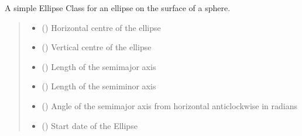 \documentclass[letterpaper,10pt,english]{sphinxmanual}
\begin{document}
\begin{fulllineitems}
\label{\detokenize{users_guide:GeoSpatialTools.octtree.SpaceTimeEllipse}}
\pysigstartsignatures
\pysiglinewithargsret
{}
{\sphinxparamcomma {}\sphinxparamcomma {}\sphinxparamcomma {}\sphinxparamcomma {}\sphinxparamcomma {}\sphinxparamcomma {}}
{}
\pysigstopsignatures
\sphinxAtStartPar
A simple Ellipse Class for an ellipse on the surface of a sphere.
\begin{quote}\begin{description}
\begin{itemize}
\item {} 
\sphinxAtStartPar
{} () \textendash{} Horizontal centre of the ellipse

\item {} 
\sphinxAtStartPar
{} () \textendash{} Vertical centre of the ellipse

\item {} 
\sphinxAtStartPar
{} () \textendash{} Length of the semi\sphinxhyphen{}major axis

\item {} 
\sphinxAtStartPar
{} () \textendash{} Length of the semi\sphinxhyphen{}minor axis

\item {} 
\sphinxAtStartPar
{} () \textendash{} Angle of the semi\sphinxhyphen{}major axis from horizontal anti\sphinxhyphen{}clockwise in radians

\item {} 
\sphinxAtStartPar
{} () \textendash{} Start date of the Ellipse


\end{itemize}
\end{description}
\end{quote}
\end{fulllineitems}
\end{document}
